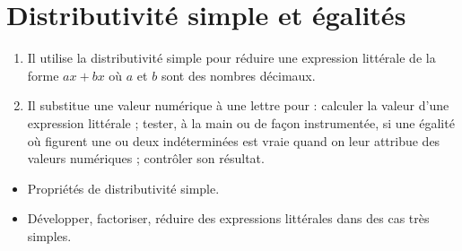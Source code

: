 \themaN
\graphicspath{{../../S17_Distributivite_et_egalites/Images/}}

\chapter{Distributivité simple et égalités}
\label{S17}

\newcommand{\tri}[3]{\pspolygon(0,0)(2,0)(2;60) \rput(1,0.25){$#1$} \rput{-120}(0.7,0.8){$#2$} \rput{120}(1.3,0.8){$#3$}}
\newcommand{\car}[4]{\psframe(0,0)(2,2) \rput(1,0.2){$#1$} \rput{90}(1.8,1){$#2$} \rput{180}(1,1.8){$#3$} \rput{-90}(0.2,1){$#4$}}


\begin{autoeval}
   \small
   \begin{enumerate}
      \item Il utilise la distributivité simple pour réduire une expression littérale de la forme $ax + bx$ où $a$ et $b$ sont des nombres décimaux.
      \item Il substitue une valeur numérique à une lettre pour : calculer la valeur d’une expression littérale ; tester, à la main ou de façon instrumentée, si une égalité où figurent une ou deux indéterminées est vraie quand on leur attribue des valeurs numériques ; contrôler son résultat.
   \end{enumerate}
\end{autoeval}

\begin{prerequis}
   \begin{itemize}
      \item Propriétés de distributivité simple.
      \item[\com] Développer, factoriser, réduire des expressions littérales dans des cas très simples.
   \end{itemize}
\end{prerequis}

\vfill

